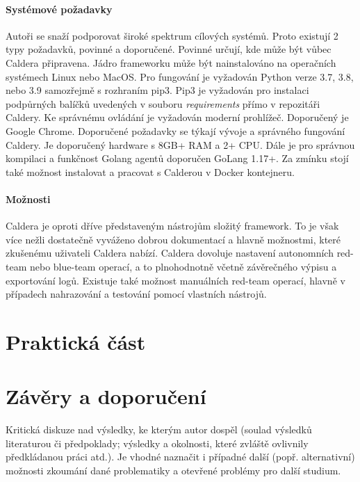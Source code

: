 \paragraph{Systémové požadavky}
Autoři se snaží podporovat široké spektrum cílových systémů.
Proto existují 2 typy požadavků, povinné a doporučené.
Povinné určují, kde může být vůbec Caldera připravena.
Jádro frameworku může být nainstalováno na operačních systémech Linux nebo MacOS.
Pro fungování je vyžadován Python verze 3.7, 3.8, nebo 3.9 samozřejmě s rozhraním pip3.
Pip3 je vyžadován pro instalaci podpůrných balíčků uvedených v souboru \textit{requirements} přímo v repozitáři Caldery.
Ke správnému ovládání je vyžadován moderní prohlížeč.
Doporučený je Google Chrome.
Doporučené požadavky se týkají vývoje a správného fungování Caldery.
Je doporučený hardware s 8GB+ RAM a 2+ CPU\@.
Dále je pro správnou kompilaci a funkčnost Golang agentů doporučen GoLang 1.17+.
Za zmínku stojí také možnost instalovat a pracovat s Calderou v Docker kontejneru.\cite{mitre_caldera_docs}

\paragraph{Možnosti}
Caldera je oproti dříve představeným nástrojům složitý framework.
To je však více nežli dostatečně vyváženo dobrou dokumentací a hlavně možnostmi, které zkušenému uživateli Caldera nabízí.
Caldera dovoluje nastavení autonomních red-team nebo blue-team operací, a to plnohodnotně včetně závěrečného výpisu a exportování logů.
Existuje také možnost manuálních red-team operací, hlavně v případech nahrazování a testování pomocí vlastních nástrojů.\cite{mitre_caldera_docs}



\section{Praktická část}


\section{Závěry a doporučení}


Kritická diskuze nad výsledky, ke kterým autor dospěl (soulad výsledků  literaturou či předpoklady;
výsledky a okolnosti, které zvláště ovlivnily předkládanou práci atd.).
Je vhodné naznačit i případné další
(popř. alternativní) možnosti zkoumání dané problematiky a otevřené problémy pro další studium.

